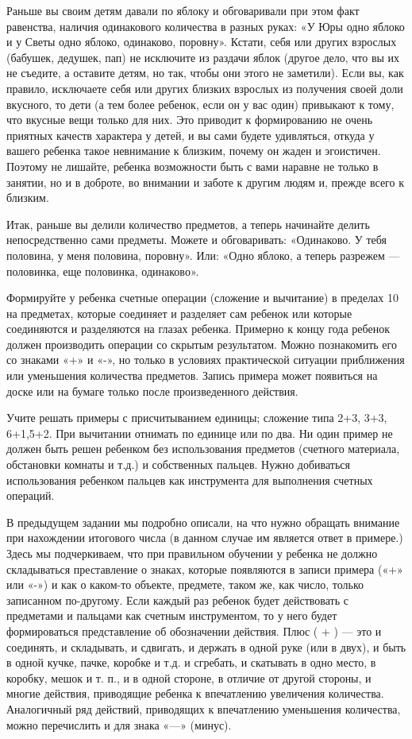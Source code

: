 \documentclass[a5paper]{book}
\begin{document}
Раньше вы своим детям давали по яблоку и обговаривали при этом факт
равенства, наличия одинакового количества в разных руках: «У Юры одно
яблоко и у Светы одно яблоко, одинаково, поровну». Кстати, себя или
других взрослых (бабушек, дедушек, пап) не исключите из раздачи яблок
(другое дело, что вы их не съедите, а оставите детям, но так, чтобы они
этого не заметили). Если вы, как правило, исключаете себя или других
близких взрослых из получения своей доли вкусного, то дети (а тем более
ребенок, если он у вас один) привыкают к тому, что вкусные вещи только
для них. Это приводит к формированию не очень приятных качеств характера
у детей, и вы сами будете удивляться, откуда у вашего ребенка такое
невнимание к близким, почему он жаден и эгоистичен. Поэтому не лишайте,
ребенка возможности быть с вами наравне не только в занятии, но и в
доброте, во внимании и заботе к другим людям и, прежде всего к близким.

Итак, раньше вы делили количество предметов, а теперь начинайте делить
непосредственно сами предметы. Можете и обговаривать: «Одинаково. У тебя
половина, у меня половина, поровну». Или: «Одно яблоко, а теперь
разрежем --- половинка, еще половинка, одинаково».

Формируйте у ребенка счетные операции (сложение и вычитание) в пределах
10 на предметах, которые соединяет и разделяет сам ребенок или которые
соединяются и разделяются на глазах ребенка. Примерно к концу года
ребенок должен производить операции со скрытым результатом. Можно
познакомить его со знаками «+» и «-», но только в условиях практической
ситуации приближения или уменьшения количества предметов. Запись примера
может появиться на доске или на бумаге только после произведенного
действия.

Учите решать примеры с присчитыванием единицы; сложение типа 2+3, 3+3,
6+1,5+2. При вычитании отнимать по единице или по два. Ни один пример не
должен быть решен ребенком без использования предметов (счетного
материала, обстановки комнаты и т.д.) и собственных пальцев. Нужно
добиваться использования ребенком пальцев как инструмента для выполнения
счетных операций.

В предыдущем задании мы подробно описали, на что нужно обращать внимание
при нахождении итогового числа (в данном случае им является ответ в
примере.) Здесь мы подчеркиваем, что при правильном обучении у ребенка
не должно складываться преставление о знаках, которые появляются в
записи примера («+» или «-») и как о каком-то объекте, предмете, таком
же, как число, только записанном по-другому. Если каждый раз ребенок
будет действовать с предметами и пальцами как счетным инструментом, то у
него будет формироваться представление об обозначении действия. Плюс ( +
) --- это и соединять, и складывать, и сдвигать, и держать в одной руке
(или в двух), и быть в одной кучке, пачке, коробке и т.д. и сгребать, и
скатывать в одно место, в коробку, мешок и т. п., и в одной стороне, в
отличие от другой стороны, и многие действия, приводящие ребенка к
впечатлению увеличения количества. Аналогичный ряд действий, приводящих
к впечатлению уменьшения количества, можно перечислить и для знака «---»
(минус).
\end{document}
